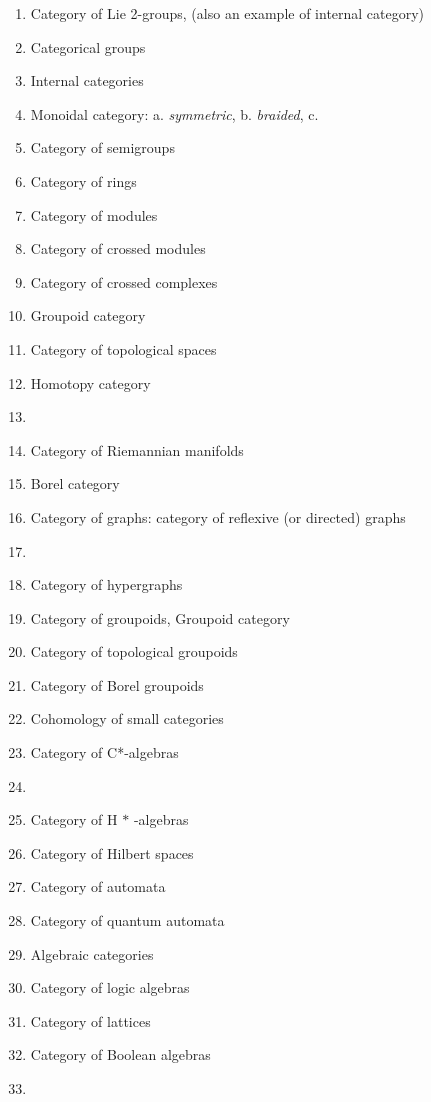 \documentclass[12pt]{article}
\theoremstyle{plain}
\theoremstyle{definition}
\numberwithin{equation}{section}
\begin{document}
\begin{enumerate}
\item Category of Lie 2-groups, (also an example of internal category)
\item Categorical groups
\item Internal categories
\item Monoidal category: a. {\em symmetric}, b. {\em braided}, c.
\item Category of semigroups
\item Category of rings
\item Category of modules
\item Category of crossed modules
\item Category of crossed complexes
\item Groupoid category
\item Category of topological spaces
\item Homotopy category
\item {} 
\item Category of Riemannian manifolds
\item Borel category
\item Category of graphs: category of reflexive (or directed) graphs
\item {}
\item Category of hypergraphs
\item Category of groupoids, Groupoid category
\item Category of topological groupoids
\item Category of Borel groupoids
\item Cohomology of small categories
\item Category of C*-algebras
\item {}
\item Category of H $*$ -algebras
\item Category of Hilbert spaces
\item Category of automata
\item Category of quantum automata
\item Algebraic categories
\item Category of logic algebras
\item Category of lattices
\item Category of Boolean algebras
\item {}

\end{enumerate}
\end{document}

